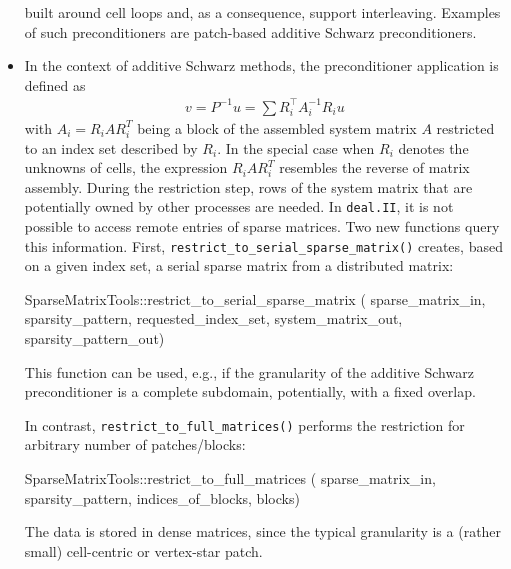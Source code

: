 \documentclass{ansarticle-preprint}
\newcommand{\specialword}[1]{\texttt{#1}}
\newcommand{\dealii}{{\specialword{deal.II}}\xspace}
\begin{document}
\begin{itemize}
  built around cell loops and, as a consequence, support interleaving. Examples of
  such preconditioners are patch-based additive Schwarz preconditioners.
  \item In the context of additive Schwarz methods, the preconditioner application
  is defined as
  \begin{align*}
  v = P^{-1} u = \sum R_i^\top A_i^{-1} R_i u 
  \end{align*}
  with $A_i = R_i A R_i^T$ being a block of the assembled system
  matrix $A$ restricted
  to an index set described by $R_i$. In the special case when $R_i$ denotes the unknowns
  of cells, the expression $R_i A R_i^T$ resembles the reverse of matrix
  assembly.
  During the restriction step,
  rows of the system matrix that are potentially owned by other
  processes are needed.  In \dealii, it is not possible to access remote entries
  of sparse matrices. Two new functions query this information. First,
  \texttt{restrict\_to\_serial\_sparse\_matrix()} creates, based
  on a given index set, a serial
  sparse matrix from a distributed matrix:
\begin{c++}
SparseMatrixTools::restrict_to_serial_sparse_matrix (
  sparse_matrix_in, sparsity_pattern, requested_index_set, 
  system_matrix_out, sparsity_pattern_out)
\end{c++}
This function can be used, e.g., if the granularity of the additive Schwarz preconditioner
is a complete subdomain, potentially, with a fixed overlap.

In contrast, \texttt{restrict\_to\_full\_matrices()} performs the restriction
for arbitrary number of patches/blocks:

\begin{c++}
SparseMatrixTools::restrict_to_full_matrices (
  sparse_matrix_in, sparsity_pattern, indices_of_blocks, blocks)
\end{c++}

The data is stored in dense matrices, since the typical granularity is a (rather small) cell-centric or
vertex-star patch.
  

\end{itemize}
\end{document}

